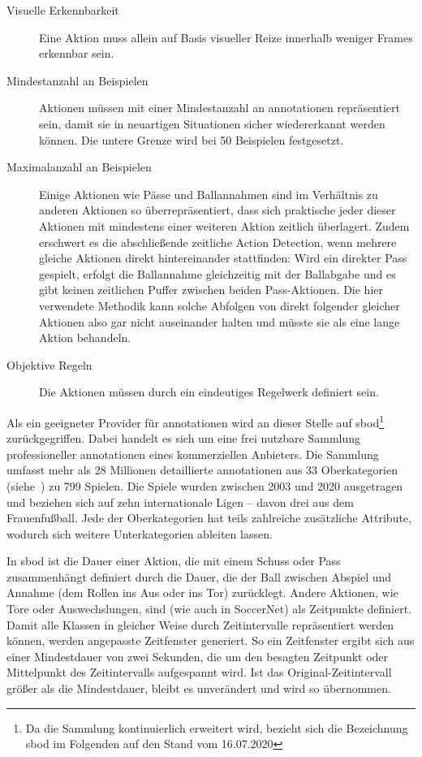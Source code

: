 \begin{description}
    \item[Visuelle Erkennbarkeit] Eine Aktion muss allein auf Basis visueller Reize innerhalb weniger Frames erkennbar sein.
    \item[Mindestanzahl an Beispielen] Aktionen müssen mit einer Mindestanzahl an \gls{annotationen} repräsentiert sein, damit sie in neuartigen Situationen sicher wiedererkannt werden können.
    Die untere Grenze wird bei 50 Beispielen festgesetzt.
    \item[Maximalanzahl an Beispielen] Einige Aktionen wie Pässe und Ballannahmen sind im Verhältnis zu anderen Aktionen so überrepräsentiert, dass sich praktische jeder dieser Aktionen mit mindestens einer weiteren Aktion zeitlich überlagert.
    Zudem erschwert es die abschließende zeitliche Action Detection, wenn mehrere gleiche Aktionen direkt hintereinander stattfinden:
    Wird \zB ein direkter Pass gespielt, erfolgt die Ballannahme gleichzeitig mit der Ballabgabe und es gibt keinen zeitlichen Puffer zwischen beiden Pass-Aktionen.
    Die hier verwendete Methodik kann solche Abfolgen von direkt folgender gleicher Aktionen also gar nicht auseinander halten und müsste sie als eine lange Aktion behandeln.
    \item[Objektive Regeln] Die Aktionen müssen durch ein eindeutiges Regelwerk definiert sein.
\end{description}

Als ein geeigneter Provider für \gls{annotationen} wird an dieser Stelle auf \gls{sbod}\footnote{Da die Sammlung kontinuierlich erweitert wird, bezieht sich die Bezeichnung \gls{sbod} im Folgenden auf den Stand vom 16.07.2020}~\cite{Statsbomb20} zurückgegriffen.
Dabei handelt es sich um eine frei nutzbare Sammlung professioneller \gls{annotationen} eines kommerziellen Anbieters.
Die Sammlung umfasst mehr als 28 Millionen detaillierte \gls{annotationen} aus 33 Oberkategorien (siehe~\cite{StatsbombDocs16}) zu 799 Spielen.
Die Spiele wurden zwischen 2003 und 2020 ausgetragen und beziehen sich auf zehn internationale Ligen -- davon drei aus dem Frauenfußball.
Jede der Oberkategorien hat teils zahlreiche zusätzliche Attribute, wodurch sich weitere Unterkategorien ableiten lassen.

In \gls{sbod} ist die Dauer einer Aktion, die mit einem Schuss oder Pass zusammenhängt definiert durch die Dauer, die der Ball zwischen Abspiel und Annahme (\bzw dem Rollen ins Aus oder ins Tor) zurücklegt.
Andere Aktionen, wie Tore oder Auswechslungen, sind (wie auch in SoccerNet) als Zeitpunkte definiert.
Damit alle Klassen in gleicher Weise durch Zeitintervalle repräsentiert werden können, werden angepasste Zeitfenster generiert.
So ein Zeitfenster ergibt sich aus einer Mindestdauer von zwei Sekunden, die um den besagten Zeitpunkt oder Mittelpunkt des Zeitintervalls aufgespannt wird.
Ist das Original-Zeitintervall größer als die Mindestdauer, bleibt es unverändert und wird so übernommen.

